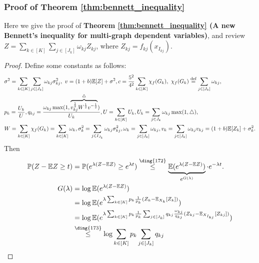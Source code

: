 \documentclass{article}
\def\eE{\mathbb{E}}
\def\pP{\mathbb{P}}
\def\defeq{\overset{\textup{def}}{=}}
\def\leqone{\overset{\text{\ding{172}}}{\leq}}
\def\leqtwo{\overset{\text{\ding{173}}}{\leq}}
\begin{document}
\subsubsection{Proof of Theorem \ref{thm:bennett_inequality}}
\label{pro:bennett_inequ}
Here we give the proof of \textbf{Theorem \ref{thm:bennett_inequality} (A new Bennett's inequality for multi-graph dependent variables)}, 
and review $Z = \sum_{k \in [K]} \sum _{j \in [J_k]} \omega_{kj} Z_{kj} $, where $Z_{kj} = f_{kj}(x_{I_{kj}})$. 
\begin{proof}
Define some constants as follows:
        \begin{align*}
            & \sigma^2 = \sum_{k \in [K]} \sum_{j \in [J_k]} \omega_{kj} \sigma_{kj}^2, \ v = (1 + b) \eE [Z] + \sigma^2, 
             c = \frac{5^2}{4^2} \sum_{k \in [K]} \chi_{f} (G_k), \ \chi_{f} (G_k) \defeq \sum_{j \in [J_k]} \omega_{kj} , \\
            & p_k = \frac{U_k}{U}, q_{kj} = \frac{\omega_{kj} \max (1, \overbrace{v_{kj}^{\frac{1}{2}} W^{\frac{1}{2}} v^{-\frac{1}{2}} } ^{\triangle})}{U_k}, 
             U = \sum_{k \in [K]} U_k, U_k = \sum_{j \in J_k} \omega_{kj} \max(1, \triangle), \\
            & W = \sum_{k \in [K]} \chi_f(G_k) = \sum_{k \in [K]} \omega_k,  
             \sigma _k^2 = \sum_{j \in I_{J_k}} \omega_{kj} \sigma _{kj}^2, \omega_k = \sum_{j \in [J_k]} \omega_{kj}, 
             v_k = \sum_{j \in [J_k]} \omega_{kj}v_{kj} = (1+b) \eE [Z_k] +\sigma _k^2. 
        \end{align*}
Then
    \begin{align*}
        \pP(Z-\eE Z \geq t) & = \pP(e^{\lambda (Z- \eE Z)} \geq e^{\lambda t}) \leqone \underbrace{  \eE(e^{\lambda (Z- \eE Z)}) }_{e^{G(\lambda )}} \cdot e^{-\lambda t}. \\
       G(\lambda )  & = \log \eE (e^{\lambda (Z - \eE Z)}) \\
        & = \log \eE (e^{\lambda \sum _{k \in [K]}p_k \frac{1}{p_k}  (Z_k - \eE _{X_k} [Z_k] )})  \\
        & = \log \eE (e^{\lambda \sum _{k \in [K]}p_k \frac{1}{p_k} \sum _{j \in [J_k] } q_{kj} \frac{\omega_{kj}}{q_{kj}}  (Z_{kj} - \eE _{X_{I_{kj}}}  [Z_{kj}] )}) \\
        & \leqtwo  \log \sum_{k \in [K]}p_k\sum_{j \in [J_k]}q_{kj} 

\end{align*}
\end{proof}
\end{document}
